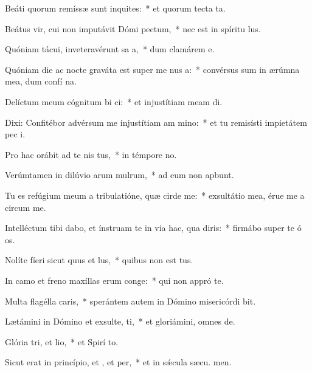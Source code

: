 \item Beáti quorum remíssæ sunt inquites:~* et quorum tecta  ta.
\item Beátus vir, cui non imputávit Dómi pectum,~* nec est in spíritu  lus.
\item Quóniam tácui, inveteravérunt sa a,~* dum clamárem  e.
\item Quóniam die ac nocte graváta est super me nus a:~* convérsus sum in ærúmna mea, dum confí na.
\item Delíctum meum cógnitum bi ci:~* et injustítiam meam  di.
\item Dixi: Confitébor advérsum me injustítiam am mino:~* et tu remisísti impietátem pec i.
\item Pro hac orábit ad te nis tus,~* in témpore no.
\item Verúmtamen in dilúvio arum mulrum,~* ad eum non apbunt.
\item Tu es refúgium meum a tribulatióne, quæ cirde me:~* exsultátio mea, érue me a circum me.
\item Intelléctum tibi dabo, et ínstruam te in via hac, qua diris:~* firmábo super te ó os.
\item Nolíte fíeri sicut quus et lus,~* quibus non est tus.
\item In camo et freno maxíllas erum conge:~* qui non appró  te.
\item Multa flagélla caris,~* sperántem autem in Dómino misericórdi bit.
\item Lætámini in Dómino et exsulte, ti,~* et gloriámini, omnes  de.
\item Glória tri, et lio,~* et Spirí to.
\item Sicut erat in princípio, et , et per,~* et in sǽcula sæcu. men.
